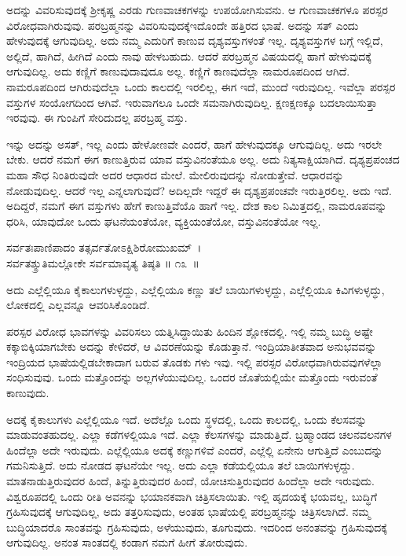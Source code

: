 ಅದನ್ನು ವಿವರಿಸುವುದಕ್ಕೆ ಶ‍್ರೀಕೃಷ್ಣ ಎರಡು ಗುಣವಾಚಕಗಳನ್ನು ಉಪಯೋಗಿಸುವನು. ಆ ಗುಣವಾಚಕಗಳೂ ಪರಸ್ಪರ ವಿರೋಧವಾಗಿರುವುವು. ಪರಬ್ರಹ್ಮನನ್ನು ವಿವರಿಸುವುದಕ್ಕೆ\break ಇದೊಂದೇ ಹತ್ತಿರದ ಭಾಷೆ. ಅದನ್ನು ಸತ್ ಎಂದು ಹೇಳುವುದಕ್ಕೆ ಆಗುವುದಿಲ್ಲ. ಅದು ನಮ್ಮ ಎದುರಿಗೆ ಕಾಣುವ ದೃಶ್ಯವಸ್ತುಗಳಂತೆ ಇಲ್ಲ. ದೃಶ್ಯವಸ್ತುಗಳ ಬಗ್ಗೆ ಇಲ್ಲಿದೆ, ಅಲ್ಲಿದೆ, ಹಾಗಿದೆ, ಹೀಗಿದೆ ಎಂದು ನಾವು ಹೇಳಬಹುದು. ಆದರೆ ಪರಬ್ರಹ್ಮನ ವಿಷಯದಲ್ಲಿ ಹಾಗೆ ಹೇಳುವುದಕ್ಕೆ ಆಗುವುದಿಲ್ಲ. ಅದು ಕಣ್ಣಿಗೆ ಕಾಣುವುದಾವುದೂ ಅಲ್ಲ. ಕಣ್ಣಿಗೆ ಕಾಣವುದೆಲ್ಲಾ ನಾಮರೂಪದಿಂದ ಆಗಿದೆ. ನಾಮರೂಪದಿಂದ ಆಗಿರುವುದೆಲ್ಲಾ ಒಂದು ಕಾಲದಲ್ಲಿ ಇರಲಿಲ್ಲ, ಈಗ ಇದೆ, ಮುಂದೆ ಇರುವುದಿಲ್ಲ. ಇವೆಲ್ಲಾ ಪರಸ್ಪರ ವಸ್ತುಗಳ ಸಂಯೋಗದಿಂದ ಆಗಿವೆ. ಇರುವಾಗಲೂ ಒಂದೇ ಸಮನಾಗಿರುವುದಿಲ್ಲ. ಕ್ಷಣಕ್ಷಣಕ್ಕೂ ಬದಲಾಯಿಸುತ್ತಾ ಇರವುವು. ಈ ಗುಂಪಿಗೆ ಸೇರಿದುದಲ್ಲ ಪರಬ್ರಹ್ಮ ವಸ್ತು.

ಇನ್ನು ಅದನ್ನು ಅಸತ್, ಇಲ್ಲ ಎಂದು ಹೇಳೋಣವೇ ಎಂದರೆ, ಹಾಗೆ ಹೇಳುವುದಕ್ಕೂ ಆಗುವುದಿಲ್ಲ. ಅದು ಇರಲೇ ಬೇಕು. ಆದರೆ ನಮಗೆ ಈಗ ಕಾಣುತ್ತಿರುವ ಯಾವ ವಸ್ತುವಿನಂತೆಯೂ ಅಲ್ಲ. ಅದು ನಿತ್ಯಸಾಕ್ಷಿಯಾಗಿದೆ. ದೃಶ್ಯಪ್ರಪಂಚದ ಮಹಾ ಸೌಧ ನಿಂತಿರುವುದೇ ಅದರ ಆಧಾರದ ಮೇಲೆ. ಮೇಲಿರುವುದನ್ನು ನೋಡುತ್ತೇವೆ. ಆಧಾರವನ್ನು ನೋಡುವುದಿಲ್ಲ. ಆದರೆ ಇಲ್ಲ ಎನ್ನಲಾಗುವುದೆ? ಅದಿಲ್ಲದೇ ಇದ್ದರೆ ಈ ದೃಶ್ಯಪ್ರಪಂಚವೇ ಇರುತ್ತಿರಲಿಲ್ಲ. ಅದು ಇದೆ. ಅದಿದ್ದರೆ, ನಮಗೆ ಈಗ ವಸ್ತುಗಳು ಹೇಗೆ ಕಾಣುತ್ತಿವೆಯೊ ಹಾಗೆ ಇಲ್ಲ. ದೇಶ ಕಾಲ ನಿಮಿತ್ತದಲ್ಲಿ, ನಾಮರೂಪವನ್ನು ಧರಿಸಿ, ಯಾವುದೋ ಒಂದು ಘಟನೆಯಂತೆಯೋ, ವ್ಯಕ್ತಿಯಂತೆಯೋ, ವಸ್ತುವಿನಂತೆಯೋ ಇಲ್ಲ.

\begin{shloka}
ಸರ್ವತಃಪಾಣಿಪಾದಂ ತತ್ಸರ್ವತೋಽಕ್ಷಿಶಿರೋಮುಖಮ್~।\\ಸರ್ವತಶ್ಶ್ರುತಿಮಲ್ಲೋಕೇ ಸರ್ವಮಾವೃತ್ಯ ತಿಷ್ಠತಿ \hfill॥ ೧೩~॥
\end{shloka}

\begin{artha}
ಅದು ಎಲ್ಲೆಲ್ಲಿಯೂ ಕೈಕಾಲುಗಳುಳ್ಳದ್ದು, ಎಲ್ಲೆಲ್ಲಿಯೂ ಕಣ್ಣು ತಲೆ ಬಾಯಿಗಳುಳ್ಳದ್ದು, ಎಲ್ಲೆಲ್ಲಿಯೂ ಕಿವಿಗಳುಳ್ಳದ್ಧು, ಲೋಕದಲ್ಲಿ ಎಲ್ಲವನ್ನೂ ಆವರಿಸಿಕೊಂಡಿದೆ.
\end{artha}

ಪರಸ್ಪರ ವಿರೋಧ ಭಾವಗಳನ್ನು ವಿವರಿಸಲು ಯತ್ನಿಸಿದ್ದಾಯಿತು ಹಿಂದಿನ ಶ್ಲೋಕದಲ್ಲಿ. ಇಲ್ಲಿ ನಮ್ಮ ಬುದ್ಧಿ ಅಷ್ಟೇ ಕಕ್ಕಾಬಿಕ್ಕಿಯಾಗಬೇಕು ಅದನ್ನು ಕೇಳಿದರೆ, ಆ ವಿವರಣೆಯನ್ನು ಕೊಡುತ್ತಾನೆ. ಇಂದ್ರಿಯಾತೀತವಾದ ಅನುಭವವನ್ನು ಇಂದ್ರಿಯದ ಭಾಷೆಯಲ್ಲಿಡಬೇಕಾದಾಗ ಬರುವ ತೊಡಕು ಗಳು ಇವು. ಇಲ್ಲಿ ಪರಸ್ಪರ ವಿರೋಧವಾಗಿರುವವುಗಳೆಲ್ಲಾ ಸಂಧಿಸುವುವು. ಒಂದು ಮತ್ತೊಂದನ್ನು ಅಲ್ಲಗಳೆಯುವುದಿಲ್ಲ. ಒಂದರ ಜೊತೆಯಲ್ಲಿಯೇ ಮತ್ತೊಂದು ಇರುವಂತೆ ಕಾಣುವುದು.

ಅದಕ್ಕೆ ಕೈಕಾಲುಗಳು ಎಲ್ಲೆಲ್ಲಿಯೂ ಇದೆ. ಅದೆಲ್ಲೊ ಒಂದು ಸ್ಥಳದಲ್ಲಿ, ಒಂದು ಕಾಲದಲ್ಲಿ, ಒಂದು ಕೆಲಸವನ್ನು ಮಾಡುವಂತಹುದಲ್ಲ. ಎಲ್ಲಾ ಕಡೆಗಳಲ್ಲಿಯೂ ಇದೆ. ಎಲ್ಲಾ ಕೆಲಸಗಳನ್ನು ಮಾಡುತ್ತಿದೆ. ಬ್ರಹ್ಮಾಂಡದ ಚಲನವಲನಗಳ ಹಿಂದೆಲ್ಲಾ ಅದೇ ಇರುವುದು. ಎಲ್ಲೆಲ್ಲಿಯೂ ಅದಕ್ಕೆ ಕಣ್ಣುಗಳಿವೆ ಎಂದರೆ, ಎಲ್ಲೆಲ್ಲಿ ಏನೇನು ಆಗುತ್ತಿದೆ ಎಂಬುದನ್ನು ಗಮನಿಸುತ್ತಿದೆ. ಅದು ನೋಡದ ಘಟನೆಯೇ ಇಲ್ಲ. ಅದು ಎಲ್ಲಾ ಕಡೆಯಲ್ಲಿಯೂ ತಲೆ ಬಾಯಿಗಳುಳ್ಳದ್ದು. ಮಾತನಾಡುತ್ತಿರುವುದರ ಹಿಂದೆ, ತಿನ್ನುತ್ತಿರುವುದರ ಹಿಂದೆ, ಯೋಚಿಸುತ್ತಿರುವುದರ ಹಿಂದೆಲ್ಲಾ ಅದೇ ಇರುವುದು. ವಿಶ್ವರೂಪದಲ್ಲಿ ಒಂದು ರೀತಿ ಅವನನ್ನು ಭಯಾನಕವಾಗಿ ಚಿತ್ರಿಸಲಾಯಿತು. ಇಲ್ಲಿ ಹೃದಯಕ್ಕೆ ಭಯವಲ್ಲ, ಬುದ್ಧಿಗೆ ಗ್ರಹಿಸುವುದಕ್ಕೆ ಆಗುವುದಿಲ್ಲ, ಅದು ತತ್ತರಿಸುವುದು, ಅಂತಹ ಭಾಷೆಯಲ್ಲಿ ಪರಬ್ರಹ್ಮನನ್ನು ಚಿತ್ರಿಸಲಾಗಿದೆ. ನಮ್ಮ ಬುದ್ಧಿಯಾದರೊ ಸಾಂತವನ್ನು ಗ್ರಹಿಸುವುದು, ಅಳೆಯುವುದು, ತೂಗುವುದು. ಇದರಿಂದ ಅನಂತವನ್ನು ಗ್ರಹಿಸುವುದಕ್ಕೆ ಆಗುವುದಿಲ್ಲ. ಅನಂತ ಸಾಂತದಲ್ಲಿ ಕಂಡಾಗ ನಮಗೆ ಹೀಗೆ ತೋರುವುದು.

